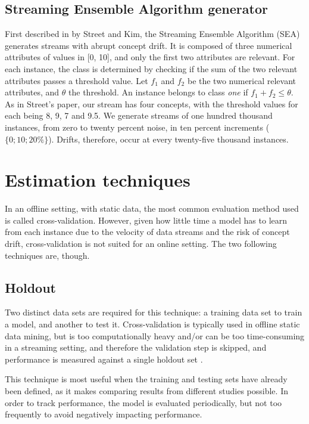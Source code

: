 \subsection{Streaming Ensemble Algorithm generator}
First described in \cite{street2001streaming} by Street and Kim, the Streaming Ensemble Algorithm (SEA) generates streams with abrupt concept drift. It is composed of three numerical attributes of values in [0, 10], and only the first two attributes are relevant. For each instance, the class is determined by checking if the sum of the two relevant attributes passes a threshold value. Let $f_1$ and $f_2$ be the two numerical relevant attributes, and $\theta$ the threshold. An instance belongs to class \textit{one} if $f_1 + f_2 \leq \theta$. As in Street's paper, our stream has four concepts, with the threshold values for each being 8, 9, 7 and 9.5. We generate streams of one hundred thousand instances, from zero to twenty percent noise, in ten percent increments ($\{0; 10; 20\%\}$). Drifts, therefore, occur at every twenty-five thousand instances.

\section{Estimation techniques}
In an offline setting, with static data, the most common evaluation method used is called cross-validation. However, given how little time a model has to learn from each instance due to the velocity of data streams and the risk of concept drift, cross-validation is not suited for an online setting. The two following techniques are, though.

\subsection{Holdout}
Two distinct data sets are required for this technique: a training data set to train a model, and another to test it.  Cross-validation is typically used in offline static data mining, but is too computationally heavy and/or can be too time-consuming in a streaming setting, and therefore the validation step is skipped, and performance is measured against a single holdout set \cite{bifet2009data}.
 
This technique is most useful when the training and testing sets have already been defined, as it makes comparing results from different studies possible.
In order to track performance, the model is evaluated periodically, but not too frequently to avoid negatively impacting performance.

